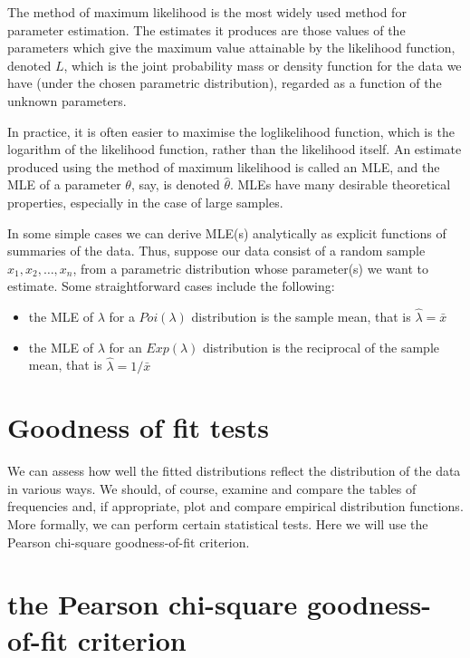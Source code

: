 \documentclass[
]{book}
\theoremstyle{definition}
\theoremstyle{definition}
\theoremstyle{definition}
\theoremstyle{definition}
\theoremstyle{remark}
\begin{document}
The method of maximum likelihood is the most widely used method for
parameter estimation. The estimates it produces are those values of the
parameters which give the maximum value attainable by the likelihood
function, denoted \(L\), which is the joint probability mass or density
function for the data we have (under the chosen parametric
distribution), regarded as a function of the unknown parameters.

In practice, it is often easier to maximise the loglikelihood function,
which is the logarithm of the likelihood function, rather than the
likelihood itself. An estimate produced using the method of maximum
likelihood is called an MLE, and the MLE of a parameter \(\theta\), say,
is denoted \(\hat{\theta}\). MLEs have many desirable theoretical
properties, especially in the case of large samples.

In some simple cases we can derive MLE(s) analytically as explicit
functions of summaries of the data. Thus, suppose our data consist of a
random sample \(x_1, x_2, \ldots , x_n\), from a parametric distribution
whose parameter(s) we want to estimate. Some straightforward cases
include the following:

\begin{itemize}
\item
  the MLE of \(\lambda\) for a \(Poi(\lambda)\) distribution is the sample
  mean, that is \(\hat{\lambda} = \bar{x}\)
\item
  the MLE of \(\lambda\) for an \(Exp(\lambda)\) distribution is the
  reciprocal of the sample mean, that is \(\hat{\lambda} = 1/\bar{x}\)
\end{itemize}

\hypertarget{goodness-of-fit-tests}{%
\section{Goodness of fit tests}\label{goodness-of-fit-tests}}

We can assess how well the fitted distributions reflect the distribution
of the data in various ways. We should, of course, examine and compare
the tables of frequencies and, if appropriate, plot and compare
empirical distribution functions. More formally, we can perform certain
statistical tests. Here we will use the Pearson chi-square
goodness-of-fit criterion.

\hypertarget{the-pearson-chi-square-goodness-of-fit-criterion}{%
\section{the Pearson chi-square goodness-of-fit criterion}\label{the-pearson-chi-square-goodness-of-fit-criterion}}
\end{document}
